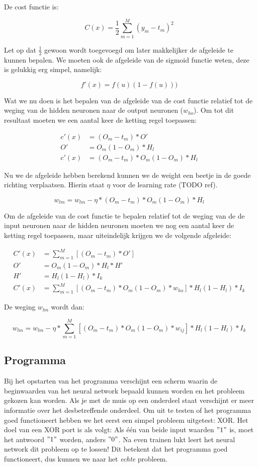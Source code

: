 \documentclass[a4paper,titlepage]{article}
\begin{document}
De cost functie is:

$$ C(x) = \frac{1}{2}\sum_{m=1}^{M}(y_{m}-t_{m})^2 $$

Let op dat $\frac{1}{2}$ gewoon wordt toegevoegd om later makkelijker de afgeleide te kunnen bepalen. We moeten ook de afgeleide van de sigmoid functie weten, deze is gelukkig erg simpel, namelijk:

$$ f'(x) = f(u)(1-f(u))) $$

Wat we nu doen is het bepalen van de afgeleide van de cost functie relatief tot de weging van de hidden neuronen naar de output neuronen ($w_{ho}$). Om tot dit resultaat moeten we een aantal keer de ketting regel toepassen:

\begin{align*}
	c'(x) &= (O_{m}-t_{m}) * O' \\
	O' &= O_{m}(1-O_{m}) * H_{l} \\
	c'(x) &= (O_{m}-t_{m}) * O_{m}(1-O_{m})*H_{l}
\end{align*}

Nu we de afgeleide hebben berekend kunnen we de weight een beetje in de goede richting verplaatsen. Hierin staat $\eta$ voor de learning rate (TODO ref).

$$ w_{lm} = w_{lm} - \eta *(O_{m}-t_{m}) * O_{m}(1-O_{m})*H_{l} $$

Om de afgeleide van de cost functie te bepalen relatief tot de weging van de de input neuronen naar de hidden neuronen moeten we nog een aantal keer de ketting regel toepassen, maar uiteindelijk krijgen we de volgende afgeleide:

\begin{align*}
	C'(x) &= \sum_{m=1}^{M}[(O_{m}-t_{m}) * O'] \\
	O' &= O_{m}(1-O_{m}) * H_{l} * H' \\
	H' &= H_{l}(1-H_{l})*I_{k}\\
	C'(x) &= \sum_{m=1}^{M}[(O_{m}-t_{m}) * O_{m}(1-O_{m})*w_{ho}]*H_{l}(1-H_{l})*I_{k}
\end{align*}



De weging $w_{lm}$ wordt dan:

$$ w_{lm} = w_{lm} - \eta *\sum_{m=1}^{M}[(O_{m}-t_{m}) * O_{m}(1-O_{m})*w_{ij}]*H_{l}(1-H_{l})*I_{k} $$

\subsection{Programma}
Bij het opstarten van het programma verschijnt een scherm waarin de beginwaarden van het neural network bepaald kunnen worden en het probleem gekozen kan worden. Als je met de muis op een onderdeel staat verschijnt er meer informatie over het desbetreffende onderdeel. Om uit te testen of het programma goed functioneert hebben we het eerst een simpel probleem uitgetest: XOR. Het doel van een XOR port is als volgt: Als \'e\'en van beide input waarden $"1"$ is, moet het antwoord $"1"$ worden, anders $"0"$. Na even trainen lukt leert het neural network dit probleem op te lossen! Dit betekent dat het programma goed functioneert, dus kunnen we naar het \textit{echte} probleem.
\end{document}
